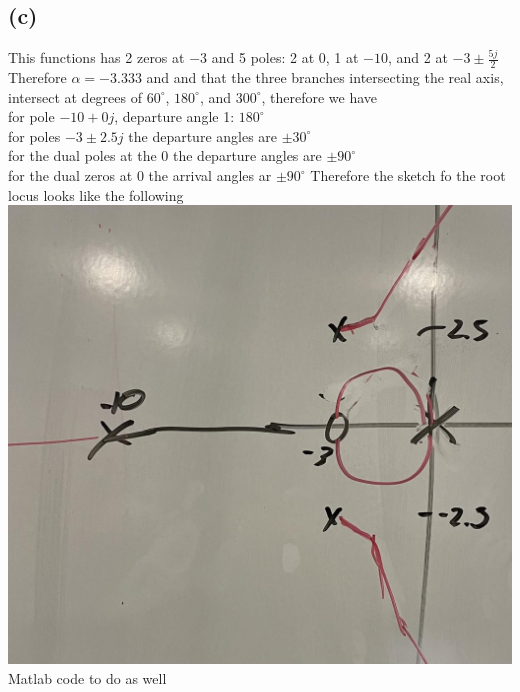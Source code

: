 \documentclass[12pt]{article}
\begin{document}
\subsection*{(c)}
This functions has 2 zeros at $-3$ and 5 poles: 2 at $0$, 1 at $-10$, and 2 at $-3\pm\frac{5j}{2}$
Therefore $\alpha=-3.333$ and and that the three branches intersecting the real axis, intersect at degrees of
$60^{\circ}$, $180^{\circ}$, and $300^{\circ}$,
therefore we have
\\for pole $-10+0j$, departure angle 1: $180^{\circ}$
\\for poles $-3\pm2.5j$ the departure angles are $\pm30^{\circ}$
\\for the dual poles at the $0$ the departure angles are $\pm90^{\circ}$
\\for the dual zeros at $0$ the arrival angles ar $\pm90^{\circ}$
Therefore the sketch fo the root locus looks like the following
\\
\includegraphics[scale=.15]{Problem2Sketch1.jpg}
\\Matlab code to do as well
\end{document}

